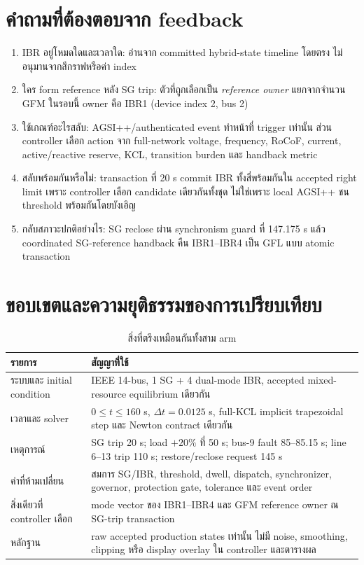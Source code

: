 \documentclass[12pt,a4paper]{article}
\begin{document}
\section{คำถามที่ต้องตอบจาก feedback}
\begin{enumerate}
\item IBR อยู่โหมดใดและเวลาใด: อ่านจาก committed hybrid-state timeline โดยตรง ไม่อนุมานจากสีกราฟหรือค่า index
\item ใคร form reference หลัง SG trip: ตัวที่ถูกเลือกเป็น \emph{reference owner} แยกจากจำนวน GFM ในรอบนี้ owner คือ IBR1 (device index 2, bus 2)
\item ใช้เกณฑ์อะไรสลับ: AGSI++/authenticated event ทำหน้าที่ trigger เท่านั้น ส่วน controller เลือก action จาก full-network voltage, frequency, RoCoF, current, active/reactive reserve, KCL, transition burden และ handback metric
\item สลับพร้อมกันหรือไม่: transaction ที่ 20 s commit IBR ทั้งสี่พร้อมกันใน accepted right limit เพราะ controller เลือก candidate เดียวกันทั้งชุด ไม่ใช่เพราะ local AGSI++ ชน threshold พร้อมกันโดยบังเอิญ
\item กลับสภาวะปกติอย่างไร: SG reclose ผ่าน synchronism guard ที่ 147.175 s แล้ว coordinated SG-reference handback คืน IBR1--IBR4 เป็น GFL แบบ atomic transaction
\end{enumerate}

\section{ขอบเขตและความยุติธรรมของการเปรียบเทียบ}
\begin{table}[H]\centering\caption{สิ่งที่ตรึงเหมือนกันทั้งสาม arm}
\begin{tabularx}{\textwidth}{p{}X}\toprule
รายการ & สัญญาที่ใช้ \\\midrule
ระบบและ initial condition & IEEE 14-bus, 1 SG + 4 dual-mode IBR, accepted mixed-resource equilibrium เดียวกัน\\
เวลาและ solver & $0\le t\le160$ s, $\Delta t=0.0125$ s, full-KCL implicit trapezoidal step และ Newton contract เดียวกัน\\
เหตุการณ์ & SG trip 20 s; load $+20\%$ ที่ 50 s; bus-9 fault 85--85.15 s; line 6--13 trip 110 s; restore/reclose request 145 s\\
ค่าที่ห้ามเปลี่ยน & สมการ SG/IBR, threshold, dwell, dispatch, synchronizer, governor, protection gate, tolerance และ event order\\
สิ่งเดียวที่ controller เลือก & mode vector ของ IBR1--IBR4 และ GFM reference owner ณ SG-trip transaction\\
หลักฐาน & raw accepted production states เท่านั้น ไม่มี noise, smoothing, clipping หรือ display overlay ใน controller และตารางผล\\
\bottomrule\end{tabularx}\end{table}
\end{document}
